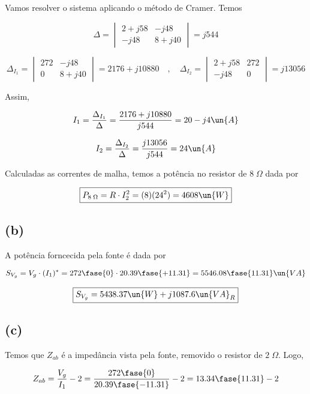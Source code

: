 \endgroup

Vamos resolver o sistema aplicando o método de Cramer. Temos

\begingroup
\renewcommand*{\arraystretch}{1.5}

\[ 
    \Delta
    =
    \begin{vmatrix}
        2 + j58 & -j48    \\
        -j48    & 8 + j40
    \end{vmatrix}
    =
    j544
\]

\[
    \Delta_{I_1}
    =
    \begin{vmatrix}
        272 & -j48    \\
        0    & 8 + j40
    \end{vmatrix}
    =
    2176 + j10880  \quad , \quad 
    \Delta_{I_2}
    =
    \begin{vmatrix}
        2 + j58 & 272    \\
        -j48    & 0
    \end{vmatrix}
    =
    j13056
\]

\endgroup

Assim, 

\[ I_1 = \frac{\Delta_{I_1}}{\Delta} = \frac{2176 + j10880}{j544} = 20 - j4 \un{A} \]

\[ I_2 = \frac{\Delta_{I_2}}{\Delta} = \frac{j13056}{j544} = 24 \un{A} \]

Calculadas as correntes de malha, temos a potência no resistor de $8 \;\Omega$ dada por

\[ \boxed{P_{8 \;\Omega} = R \cdot I_2^2 = (8)(24^2) = 4608 \un{W}}  \]

\subsection*{(b)}

A potência forncecida pela fonte é dada por

\[ S_{V_g} = V_g \cdot (I_1)^* = 272\fase{0} \cdot 20.39\fase{+11.31} = 5546.08\fase{11.31} \un{VA} \]

\[ \boxed{S_{V_g} = 5438.37 \un{W} + j1087.6 \un{VA}_R} \]

\subsection*{(c)}

Temos que $Z_{ab}$ é a impedância vista pela fonte, removido o resistor de $2 \;\Omega$. Logo,

\[ Z_{ab} = \frac{V_g}{I_1} - 2 = \frac{272\fase{0}}{20.39\fase{-11.31}} - 2 = 13.34\fase{11.31} - 2 \]

